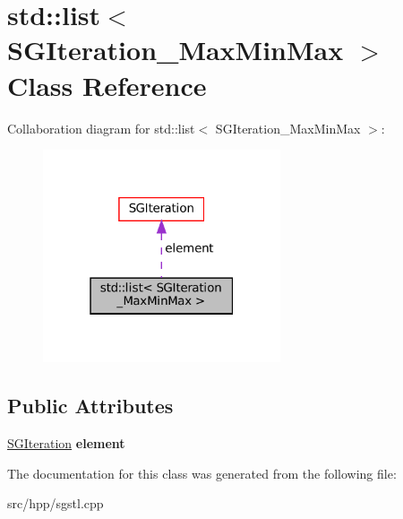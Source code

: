 \hypertarget{classstd_1_1list_3_01SGIteration__MaxMinMax_01_4}{}\section{std\+:\+:list$<$ S\+G\+Iteration\+\_\+\+Max\+Min\+Max $>$ Class Reference}
\label{classstd_1_1list_3_01SGIteration__MaxMinMax_01_4}


Collaboration diagram for std\+:\+:list$<$ S\+G\+Iteration\+\_\+\+Max\+Min\+Max $>$\+:
\nopagebreak
\begin{figure}[H]
\begin{center}
\leavevmode
\includegraphics[width=199pt]{classstd_1_1list_3_01SGIteration__MaxMinMax_01_4__coll__graph}
\end{center}
\end{figure}
\subsection*{Public Attributes}
\begin{DoxyCompactItemize}
\item 
\mbox{\label{classstd_1_1list_3_01SGIteration__MaxMinMax_01_4_a1aa648739f53cf8bc81864aededf7ad3}} 
\hyperlink{classSGIteration}{S\+G\+Iteration} {\bfseries element}
\end{DoxyCompactItemize}


The documentation for this class was generated from the following file\+:\begin{DoxyCompactItemize}
\item 
src/hpp/sgstl.\+cpp\end{DoxyCompactItemize}
